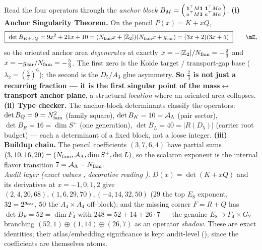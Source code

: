 \begin{keybox}
Read the four operators through the \emph{anchor block} $B_M=\begin{psmallmatrix}\mathbf1^\top M\mathbf1&\mathbf1^\top Ma\\a^\top M\mathbf1&a^\top Ma\end{psmallmatrix}$.
\textbf{(i) Anchor Singularity Theorem.} On the pencil $P(x)=K+xQ$,
\[
  \boxed{\ \det B_{K+xQ}=9x^2+21x+10=(\Nfam x+|\Z_2|)(\Nfam x+\gcar)=(3x+2)(3x+5)\ }\qquad\mE ,
\]
so the oriented anchor area \emph{degenerates} at exactly $x=-|\mathbb{Z}_2|/N_{\mathrm{fam}}=-\tfrac23$ and $x=-g_{\mathrm{car}}/N_{\mathrm{fam}}=-\tfrac53$.
The first zero is the Koide target / transport-gap base ($\lambda_2=(\tfrac23)^6$); the second is the $D_5/A_3$
glue asymmetry. \textbf{So $\tfrac23$ is not just a recurring fraction --- it is the first singular point of the
mass$\leftrightarrow$transport anchor plane}, a structural \emph{location} where an oriented area collapses.
\textbf{(ii) Type checker.} The anchor-block determinants classify the operators:
$\det B_Q=9=N_{\mathrm{fam}}^2$ (family square), $\det B_K=10=\mathcal A_\Lambda$ (pair sector), $\det B_R=16=\dim S^+$ (one generation),
$\det B_L=40=|R(D_5)|$ (carrier root budget) --- each a determinant of a fixed block, not a loose integer.
\textbf{(iii) Buildup chain.} The pencil coefficients $(3,7,6,4)$ have partial sums $(3,10,16,20)=(N_{\mathrm{fam}},\mathcal A_\Lambda,\dim S^+,\det L)$,
so the scalaron exponent is the internal flavor transition $7=\mathcal A_\Lambda-N_{\mathrm{fam}}$.
\smallskip\\
\noindent\emph{Audit layer (exact values \mE, decorative reading \mC).} $D(x)=\det(K{+}xQ)$ and its derivatives
at $x=-1,0,1,2$ give $(2,4,20,68),(1,6,29,70),(-4,14,32,50)$ ($29$ the top $E_8$ exponent, $32=2^{g_{\mathrm{car}}}$, $50$
the $A_4{\times}A_4$ off-block); and the missing corner $F=R+Q$ has $\det B_F=52=\dim F_4$ with
$248=52+14+26\cdot7$ --- the genuine $E_8\!\supset\!F_4{\times}G_2$ branching $(52,1){\oplus}(1,14){\oplus}(26,7)$
as an operator \emph{shadow}. These are exact identities; their atlas/embedding significance is kept audit-level
(\mC), since the coefficients are themselves atoms.
\end{keybox}

